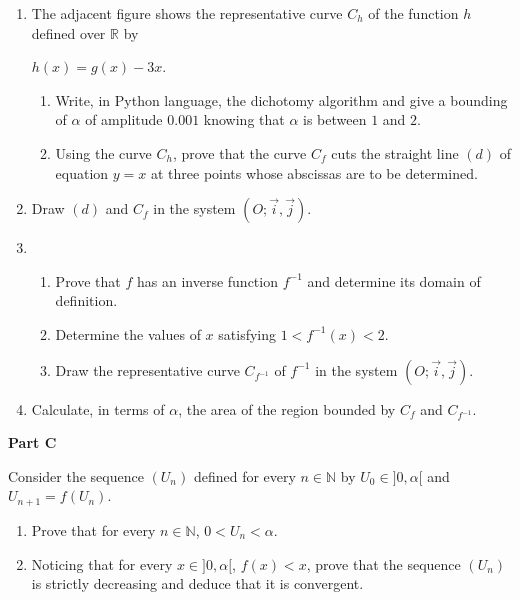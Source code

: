 \documentclass[a4paper,12pt]{article}
\begin{document}
\begin{tcolorbox}[title= \textbf{Exercise}, colframe=black, colback=white]
\begin{enumerate}[font=\bfseries]
	\item The adjacent figure shows the representative curve $C_h$ of the function $h$ defined over $\mathbb{R}$ by 
	
	$h(x)=g(x)-3x$.
	
	\begin{enumerate}[font=\bfseries]
		\item Write, in Python language, the dichotomy algorithm and give a bounding of $\alpha$ of amplitude $0.001$ 
		knowing that $\alpha$ is between $1$ and $2$.
		\item Using the curve $C_h$, prove that the curve $C_f$ cuts the straight line $(d)$ of equation $y=x$ at three 
		points whose abscissas are to be determined.
	\end{enumerate}
	\item Draw $(d)$ and $C_f$ in the system $\left( O; \overrightarrow{i} , \overrightarrow{j} \right)$.
	\item 
	\begin{enumerate}[font=\bfseries]
		\item Prove that $f$ has an inverse function $f^{-1}$ and determine its domain of definition.
		\item Determine the values of $x$ satisfying $1 < f^{-1}(x) < 2$.
		\item Draw the representative curve $C_{f^{-1}}$ of $f^{-1}$ in the system 
		$\left( O; \overrightarrow{i} , \overrightarrow{j} \right)$.
	\end{enumerate}
	\item Calculate, in terms of $\alpha$, the area of the region bounded by $C_f$ and $C_{f^{-1}}$.
\end{enumerate}

\vspace{0.5cm}

\textbf{Part C}

\medskip

Consider the sequence $(U_n)$ defined for every $n \in \mathbb{N}$ by $U_0 \in ]0, \alpha[$ and $U_{n+1}=f(U_n)$.

\begin{enumerate}[font=\bfseries]
	\item Prove that for every $n \in \mathbb{N}$, $0 < U_n <\alpha$.
	\item Noticing that for every $x \in ]0,\alpha[$, $f(x) < x$, prove that the sequence $(U_n)$ is strictly decreasing and 
	deduce that it is convergent.
\end{enumerate}
\end{tcolorbox}
\end{document}
